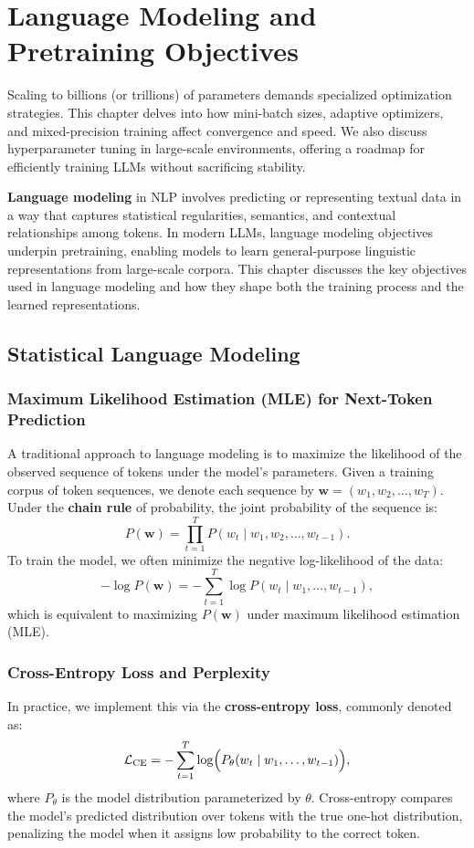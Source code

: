 \chapter{Language Modeling and Pretraining Objectives}
\noindent
Scaling to billions (or trillions) of parameters demands specialized optimization strategies. This chapter delves into how mini-batch sizes, adaptive optimizers, and mixed-precision training affect convergence and speed. We also discuss hyperparameter tuning in large-scale environments, offering a roadmap for efficiently training LLMs without sacrificing stability.


\label{chap:lm_pretraining}

\noindent
\textbf{Language modeling} in NLP involves predicting or representing textual data in a way that captures statistical regularities, semantics, and contextual relationships among tokens. In modern LLMs, language modeling objectives underpin pretraining, enabling models to learn general-purpose linguistic representations from large-scale corpora. This chapter discusses the key objectives used in language modeling and how they shape both the training process and the learned representations.

\section{Statistical Language Modeling}
\label{sec:stat_lm}

\subsection{Maximum Likelihood Estimation (MLE) for Next-Token Prediction}
\noindent
A traditional approach to language modeling is to maximize the likelihood of the observed sequence of tokens under the model’s parameters. Given a training corpus of token sequences, we denote each sequence by \(\mathbf{w} = (w_1, w_2, \ldots, w_T)\). Under the \textbf{chain rule} of probability, the joint probability of the sequence is:
\[
P(\mathbf{w}) = \prod_{t=1}^{T} P(w_t \mid w_1, w_2, \ldots, w_{t-1}).
\]
To train the model, we often minimize the negative log-likelihood of the data:
\[
-\log P(\mathbf{w}) = -\sum_{t=1}^{T} \log P(w_t \mid w_1, \ldots, w_{t-1}),
\]
which is equivalent to maximizing \(P(\mathbf{w})\) under maximum likelihood estimation (MLE). 

\subsection{Cross-Entropy Loss and Perplexity}
\noindent
In practice, we implement this via the \textbf{cross-entropy loss}, commonly denoted as:
\[
\mathcal{L}_\text{CE} = -\sum_{t=1}^{T} \log \Bigl( P_{\theta}(w_t \mid w_1, \ldots, w_{t-1}) \Bigr),
\]
where \(P_{\theta}\) is the model distribution parameterized by \(\theta\). Cross-entropy compares the model’s predicted distribution over tokens with the true one-hot distribution, penalizing the model when it assigns low probability to the correct token.

